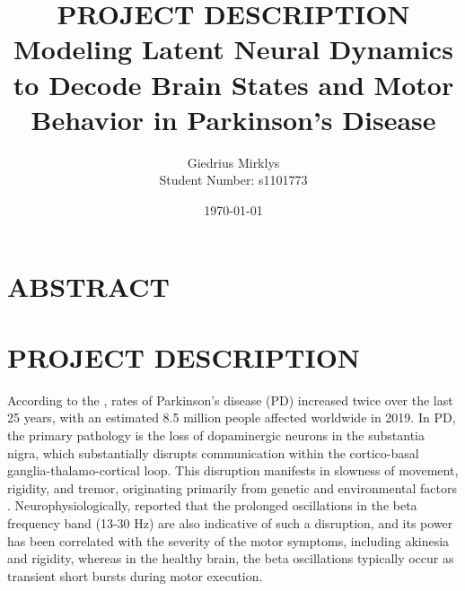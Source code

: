 \documentclass[12pt, a4paper]{article}
\begin{document}
\title{\textbf{PROJECT DESCRIPTION} \\ \vspace{1.5em} \large Modeling Latent Neural Dynamics to Decode Brain States and Motor Behavior in Parkinson’s Disease}
\author{Giedrius Mirklys \\
    \normalsize{Student Number: s1101773}}
\date{\today} %

\maketitle
\RaggedRight


\section{ABSTRACT}

\section{PROJECT DESCRIPTION}

According to the \textcite{who_parkinson_2023}, rates of Parkinson's disease (PD) increased twice over the last 25 years, with an estimated 8.5 million people affected worldwide in 2019. In PD, the primary pathology is the loss of dopaminergic neurons in the substantia nigra, which substantially disrupts communication within the cortico-basal ganglia-thalamo-cortical loop. This disruption manifests in slowness of movement, rigidity, and tremor, originating primarily from genetic and environmental factors \parencite{ben-shlomoEpidemiologyParkinsonsDisease2024}. Neurophysiologically, \textcite{tinkhauserBetaBurstDynamics2017} reported that the prolonged oscillations in the beta frequency band (13-30 Hz) are also indicative of such a disruption, and its power has been correlated with the severity of the motor symptoms, including akinesia and rigidity, whereas in the healthy brain, the beta oscillations typically occur as transient short bursts during motor execution.
\end{document}
